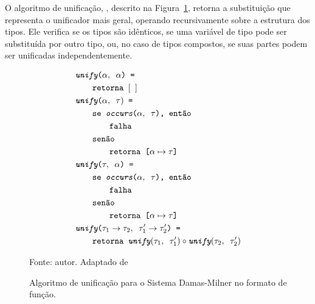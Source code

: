 O algoritmo de unificação, \Unify, descrito na Figura~\ref{algo:unify}, retorna a substituição que representa o unificador mais geral, operando recursivamente sobre a estrutura dos tipos.
Ele verifica se os tipos são idênticos, se uma variável de tipo pode ser substituída por outro tipo, ou, no caso de tipos compostos, se suas partes podem ser unificadas independentemente.

\begin{figure}[ht!]
  \centering
  \begin{align*}
     & \texttt{\Unify($\alpha, \Whitespace \alpha$) = }                                                                     \\
     & \qquad{}\texttt{\Return \Whitespace $[\Whitespace]$}                                                                 \\
     & \texttt{\Unify($\alpha, \Whitespace \tau)$ = }                                                                       \\
     & \qquad{}\texttt{\If \Whitespace \Occurs($\alpha, \Whitespace \tau$), \Then}                                          \\
     & \qquad{}\qquad{}\texttt{\Fail}                                                                                       \\
     & \qquad{}\texttt{\Else}                                                                                               \\
     & \qquad{}\qquad{}\texttt{\Return \Whitespace [$\alpha\mapsto\tau$]}                                                   \\
     & \texttt{\Unify($\tau, \Whitespace \alpha$) = }                                                                       \\
     & \qquad{}\texttt{\If \Whitespace \Occurs($\alpha, \Whitespace \tau$), \Then}                                          \\
     & \qquad{}\qquad{}\texttt{\Fail}                                                                                       \\
     & \qquad{}\texttt{\Else}                                                                                               \\
     & \qquad{}\qquad{}\texttt{\Return \Whitespace [$\alpha\mapsto\tau$]}                                                   \\
     & \texttt{\Unify($\tau_1 \to \tau_2, \Whitespace \tau_1' \to \tau_2'$) = }                                             \\
     & \qquad{}\texttt{\Return \Whitespace $\Unify(\tau_1, \Whitespace \tau_1') \circ \Unify(\tau_2, \Whitespace \tau_2')$}
  \end{align*}
  \caption{Algoritmo de unificação para o Sistema Damas-Milner no formato de função.}
  \small{Fonte: autor. Adaptado de~\cite{ribeiro2016mechanized}}\label{algo:unify}
\end{figure}

